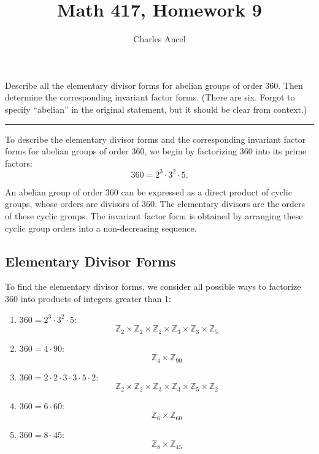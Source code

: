 \documentclass[12pt]{amsart}
\title{Math 417, Homework 9}
\author{Charles Ancel}
\theoremstyle{definition}
\numberwithin{equation}{section}
\newcommand{\Z}{\mathbb{Z}}
\begin{document}
\maketitle

\begin{exercise}{1} Describe all the elementary divisor forms for abelian groups of order 360. Then determine the corresponding invariant factor forms. (There are six. Forgot to specify ``abelian'' in the original statement, but it should be clear from context.)

    \noindent\rule{\linewidth}{1pt}

    To describe the elementary divisor forms and the corresponding invariant factor forms for abelian groups of order 360, we begin by factorizing 360 into its prime factors:
    \[
    360 = 2^3 \cdot 3^2 \cdot 5.
    \]

    An abelian group of order 360 can be expressed as a direct product of cyclic groups, whose orders are divisors of 360. The elementary divisors are the orders of these cyclic groups. The invariant factor form is obtained by arranging these cyclic group orders into a non-decreasing sequence.

    \subsection*{Elementary Divisor Forms}

    To find the elementary divisor forms, we consider all possible ways to factorize 360 into products of integers greater than 1:

    \begin{enumerate}
        \item \(360 = 2^3 \cdot 3^2 \cdot 5\):
            \[
            \Z_2 \times \Z_2 \times \Z_2 \times \Z_3 \times \Z_3 \times \Z_5
            \]

        \item \(360 = 4 \cdot 90\):
            \[
            \Z_4 \times \Z_{90}
            \]

        \item \(360 = 2 \cdot 2 \cdot 3 \cdot 3 \cdot 5 \cdot 2\):
            \[
            \Z_2 \times \Z_2 \times \Z_3 \times \Z_3 \times \Z_5 \times \Z_2
            \]

        \item \(360 = 6 \cdot 60\):
            \[
            \Z_6 \times \Z_{60}
            \]

        \item \(360 = 8 \cdot 45\):
            \[
            \Z_8 \times \Z_{45}
            \]


\end{enumerate}
\end{exercise}
\end{document}
